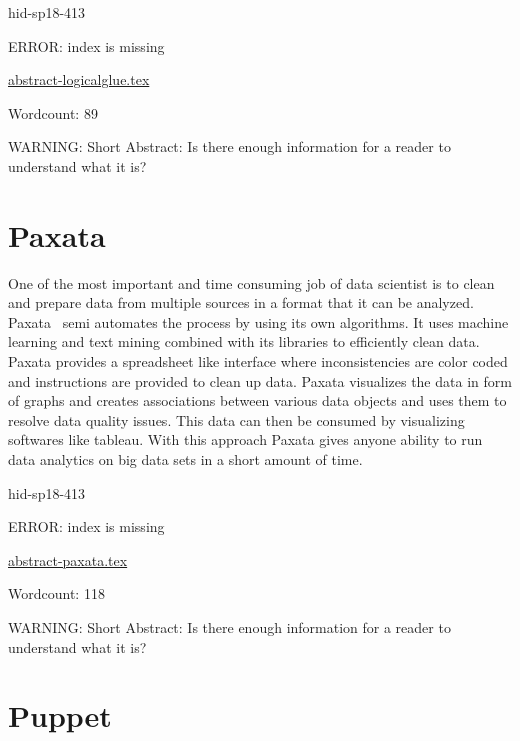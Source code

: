\begin{IU}

hid-sp18-413

ERROR: index is missing

\href{https://github.com/cloudmesh-community/hid-sp18-413/blob/master//technology/abstract-logicalglue.tex}{abstract-logicalglue.tex}

 

Wordcount: 89

WARNING: Short Abstract: Is there enough information for a reader to understand what it is?

\end{IU}

\section{Paxata}

One of the most important and time consuming job of data scientist is to clean
and prepare data from multiple sources in a format that it can be
analyzed. Paxata~\cite{hid-sp18-413-paxata} semi automates the process by using
its own algorithms. It uses machine learning and text mining combined with its
libraries to efficiently clean data. Paxata provides a spreadsheet like
interface where inconsistencies are color coded and instructions are provided to
clean up data. Paxata visualizes the data in form of graphs and creates
associations between various data objects and uses them to resolve data quality
issues. This data can then be consumed by visualizing softwares like
tableau. With this approach Paxata gives anyone ability to run data analytics on
big data sets in a short amount of time.


\begin{IU}

hid-sp18-413

ERROR: index is missing

\href{https://github.com/cloudmesh-community/hid-sp18-413/blob/master//technology/abstract-paxata.tex}{abstract-paxata.tex}

 

Wordcount: 118

WARNING: Short Abstract: Is there enough information for a reader to understand what it is?

\end{IU}

\section{Puppet}

